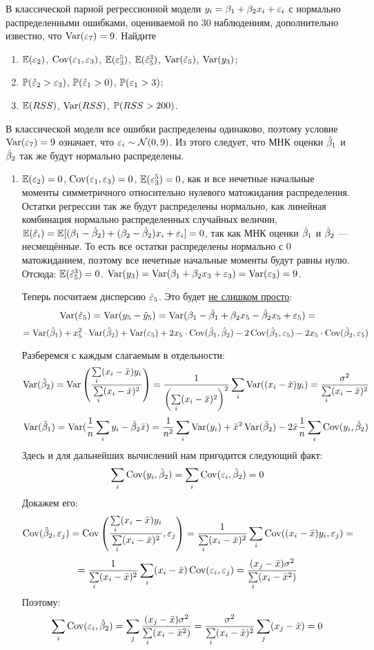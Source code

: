 \begin{problem}
В классической парной регрессионной модели $y_i = \beta_1 + \beta_2 x_i + \e_i$ с нормально распределенными ошибками, 
оцениваемой по 30 наблюдениям, дополнительно известно, что $\Var(\e_7)=9$. Найдите
\begin{enumerate}
\item $\E(\e_2)$, $\Cov(\e_1,\e_3)$, $\E(\e_3^5)$, $\E(\he_5^3)$, $\Var(\he_5)$, $\Var(y_3)$;
\item $\P(\he_2>\e_3)$, $\P(\he_1>0)$, $\P(\e_1>3)$;
\item $\E(RSS)$, $\Var(RSS)$, $\P(RSS>200)$.
\end{enumerate}


\begin{sol}
В классической модели все ошибки распределены одинаково, поэтому условие $\Var(\e_7) = 9$ означает, 
что $\e_i \sim \cN(0, 9)$. Из этого следует, что МНК оценки $\hb_1$ и $\hb_2$ так же будут нормально распределены.

\begin{enumerate}
\item $\E(\e_2) = 0$, $\Cov(\e_1, \e_3) = 0$, $\E(\e_3^5) = 0$, 
как и все нечетные начальные моменты симметричного относительно нулевого матожидания распределения. 
Остатки регрессии так же будут распределены нормально, 
как линейная комбинация нормально распределенных случайных величин, 
$\E(\he_i) = \E[(\beta_1-\hb_2) + (\beta_2-\hb_2)x_i + \e_i] = 0$, так как МНК оценки $\hb_1$ и $\hb_2$ — несмещённые. 
То есть все остатки распределены нормально с 0 матожиданием, поэтому все нечетные начальные моменты будут равны нулю. 
Отсюда: $\E(\he_5^3) = 0$. $\Var(y_3) = \Var(\beta_1 + \beta_2x_3 + \e_3) = \Var(\e_3) = 9$.

Теперь посчитаем дисперсию $\he_5$. Это будет \underline{не слишком просто}:
\[
\Var(\he_5) = \Var(y_5-\hy_5) = \Var(\beta_1-\hb_1 + \beta_2x_5-\hb_2x_5 + \e_5) =
\]
\[
= \Var(\hb_1) + x_5^2\cdot\Var(\hb_2) + \Var(\e_5) + 2x_5\cdot\Cov(\hb_1, \hb_2) - 2\Cov(\hb_1, \e_5) - 2x_5\cdot\Cov(\hb_2, \e_5)
\]

Разберемся с каждым слагаемым в отдельности:
\[
\Var(\hb_2) = \Var\left(\frac{\sum\limits_i(x_i-\bar{x})y_i}{\sum\limits_i(x_i-\bar{x})^2}\right) = \frac{1}{\left(\sum\limits_i(x_i-\bar{x})^2\right)^2}\sum\limits_i\Var((x_i-\bar{x})y_i) = \frac{\sigma^2}{\sum\limits_i(x_i-\bar{x})^2}
\]
\[
\Var(\hb_1) = \Var(\frac{1}{n}\sum\limits_iy_i - \hb_2\bar{x}) = \frac{1}{n^2}\sum\limits_i\Var(y_i)  + \bar{x}^2\Var(\hb_2) - 2\bar{x}\frac{1}{n}\sum\limits_i\Cov(y_i, \hb_2)
\]
Здесь и для дальнейших вычислений нам пригодится следующий факт:
\[
\sum\limits_i\Cov(y_i, \hb_2) = \sum\limits_i\Cov(\e_i, \hb_2)  = 0
\]
Докажем его:
\[
\Cov(\hb_2, \e_j) = \Cov\left(\frac{\sum\limits_i(x_i-\bar{x})y_i}{\sum\limits_i(x_i-\bar{x})^2}, \e_j\right) = \frac{1}{\sum\limits_i(x_i-\bar{x})^2}\sum\limits_i\Cov((x_i-\bar{x})y_i, \e_j) =
\]
\[
= \frac{1}{\sum\limits_i(x_i-\bar{x})^2} \sum\limits_i(x_i-\bar{x})\Cov(\e_i, \e_j) = \frac{(x_j - \bar{x})\sigma^2}{\sum\limits_i(x_i-\bar{x}^2)}
\]
Поэтому:
\[
\sum\limits_i\Cov(\e_i, \hb_2) = \sum\limits_j \frac{(x_j-\bar{x})\sigma^2}{\sum\limits_i(x_i-\bar{x}^2)} = \frac{\sigma^2}{\sum\limits_i(x_i-\bar{x})^2} \sum\limits_j(x_j - \bar{x}) = 0
\]


\end{enumerate}
\end{sol}
\end{problem}
